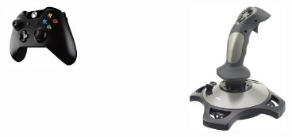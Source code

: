 \documentclass[aspectratio=169]{beamer}
\begin{document}
\begin{frame}[allowframebreaks]
	\begin{columns}
		\begin{column}{0.33\textwidth}
			\begin{figure}
				\centering
				\includegraphics[width=0.7\textwidth]{xobx.png}
			\end{figure}
		\end{column}
		\begin{column}{0.33\textwidth}
			\begin{figure}
				\centering
				\includegraphics[width=0.7\textwidth]{joysticke.png}
			\end{figure}
		\end{column}
		\begin{column}{0.33\textwidth}

\end{column}
\end{columns}
\end{frame}
\end{document}
